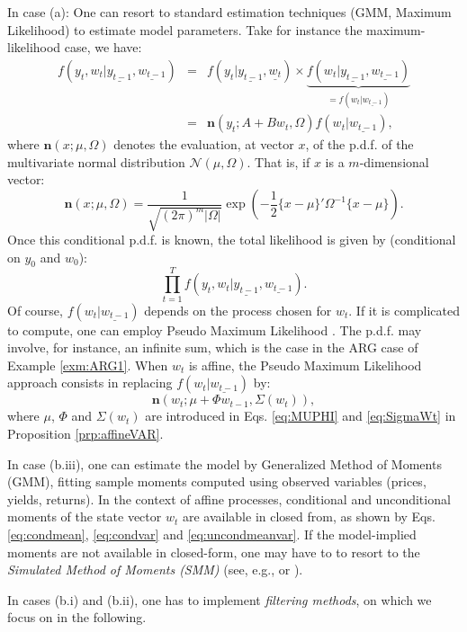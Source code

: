 \documentclass[
  12pt,
]{book}
\theoremstyle{definition}
\theoremstyle{definition}
\theoremstyle{definition}
\theoremstyle{definition}
\theoremstyle{remark}
\begin{document}
In case (a): One can resort to standard estimation techniques (GMM, Maximum Likelihood) to estimate model parameters. Take for instance the maximum-likelihood case, we have:
\begin{eqnarray*}
f(y_t,w_t|\underline{y_{t-1}},\underline{w_{t-1}}) &=& f(y_t|\underline{y_{t-1}},\underline{w_{t}}) \times \underbrace{f(w_t|\underline{y_{t-1}},\underline{w_{t-1}})}_{= f(w_t|\underline{w_{t-1}})}\\
&=& \mathbf{n}(y_t;A + Bw_t,\Omega) f(w_t|\underline{w_{t-1}}),
\end{eqnarray*}
where \(\mathbf{n}(x;\mu,\Omega)\) denotes the evaluation, at vector \(x\), of the p.d.f. of the multivariate normal distribution \(\mathcal{N}(\mu,\Omega)\). That is, if \(x\) is a \(m\)-dimensional vector:
\begin{equation}
\mathbf{n}(x;\mu,\Omega) = \frac{1}{\sqrt{(2 \pi)^{m}|\Omega|}} \exp\left(-\frac{1}{2}\{x - \mu\}'\Omega^{-1}\{x-\mu\}\right).\label{eq:varPHI}
\end{equation}
Once this conditional p.d.f. is known, the total likelihood is given by (conditional on \(y_0\) and \(w_0\)):
\[
\prod_{t=1}^T f(y_t,w_t|\underline{y_{t-1}},\underline{w_{t-1}}).
\]
Of course, \(f(w_t|\underline{w_{t-1}})\) depends on the process chosen for \(w_t\). If it is complicated to compute, one can employ Pseudo Maximum Likelihood \citep{Gourieroux_Monfort_Trognon_1984}. The p.d.f. may involve, for instance, an infinite sum, which is the case in the ARG case of Example \ref{exm:ARG1}. When \(w_t\) is affine, the Pseudo Maximum Likelihood approach consists in replacing \(f(w_t|\underline{w_{t-1}})\) by:
\[
\mathbf{n}(w_t;\mu + \Phi w_{t-1},\Sigma(w_t)),
\]
where \(\mu\), \(\Phi\) and \(\Sigma(w_t)\) are introduced in Eqs. \eqref{eq:MUPHI} and \eqref{eq:SigmaWt} in Proposition \ref{prp:affineVAR}.

In case (b.iii), one can estimate the model by Generalized Method of Moments (GMM), fitting sample moments computed using observed variables (prices, yields, returns). In the context of affine processes, conditional and unconditional moments of the state vector \(w_t\) are available in closed from, as shown by Eqs. \eqref{eq:condmean}, \eqref{eq:condvar} and \eqref{eq:uncondmeanvar}. If the model-implied moments are not available in closed-form, one may have to to resort to the \emph{Simulated Method of Moments (SMM)} (see, e.g., \citet{GourMonf96} or \citet{Duffie_Singleton_1993}).

In cases (b.i) and (b.ii), one has to implement \emph{filtering methods}, on which we focus on in the following.
\end{document}
